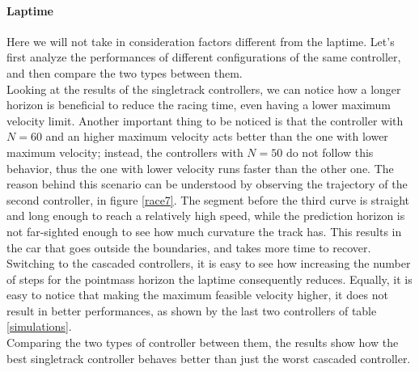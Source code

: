 \documentclass[a4paper, onecolumn, 12pt]{article}
\begin{document}
\paragraph{Laptime} \label{laptime}
Here we will not take in consideration factors different from the laptime.
Let's first analyze the performances of different configurations of the same 
controller, and then compare the two types between them. \\
Looking at the results of the singletrack controllers, we can notice how a longer
horizon is beneficial to reduce the racing time, even having a lower maximum
velocity limit. Another important thing to be noticed is that the controller
with $N=60$ and an higher maximum velocity acts better than the one with lower
maximum velocity; instead, the controllers with $N=50$ do not follow this behavior,
thus the one with lower velocity runs faster than the other one. The reason behind 
this scenario can be understood by observing the trajectory of the second controller,
in figure \ref{race7}. The segment before the third curve is straight and long enough to
reach a relatively high speed, while the prediction horizon is not far-sighted
enough to see how much curvature the track has. This results in the car that goes
outside the boundaries, and takes more time to recover. \\
Switching to the cascaded controllers, it is easy to see how increasing the number
of steps for the pointmass horizon the laptime consequently reduces. Equally, it is
easy to notice that making the maximum feasible velocity higher, it does not result
in better performances, as shown by the last two controllers of table \ref{simulations}. \\
Comparing the two types of controller between them, the results show how the best
singletrack controller behaves better than just the worst cascaded controller. 
\end{document}
